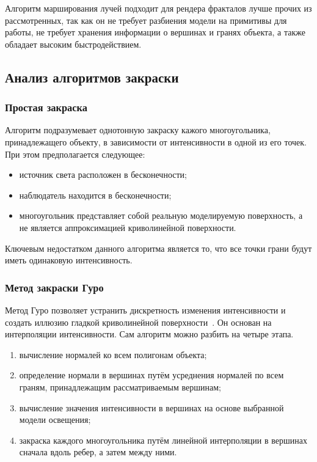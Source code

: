 Алгоритм марширования лучей подходит для рендера фракталов лучше прочих из рассмотренных,
так как он не требует разбиения модели на примитивы для работы, не требует хранения информации о вершинах и гранях объекта,
а также обладает высоким быстродействием.

\subsection{Анализ алгоритмов закраски}
\subsubsection{Простая закраска}
Алгоритм подразумевает однотонную закраску кажого многоугольника,
принадлежащего объекту, в зависимости от интенсивности в одной из его точек. При этом предполагается следующее:
\begin{itemize}
  \item источник света расположен в бесконечности;
  \item наблюдатель находится в бесконечности;
  \item многоугольник представляет собой реальную моделируемую поверхность,
    а не является аппроксимацией криволинейной поверхности.
\end{itemize}

Ключевым недостатком данного алгоритма является то, что все точки грани будут иметь одинаковую интенсивность.

\subsubsection{Метод закраски Гуро}
Метод Гуро позволяет устранить дискретность изменения интенсивности и создать иллюзию
гладкой криволинейной поверхности~\cite{rogers}. Он основан на интерполяции интенсивности. Сам алгоритм можно разбить на четыре этапа.
\begin{enumerate}
  \item вычисление нормалей ко всем полигонам объекта;
  \item определение нормали в вершинах путём усреднения нормалей по всем граням, принадлежащим
    рассматриваемым вершинам;
  \item вычисление значения интенсивности в вершинах на основе выбранной модели освещения;
  \item закраска каждого многоугольника путём линейной интерполяции в вершинах сначала вдоль ребер, а затем между ними.
\end{enumerate}

